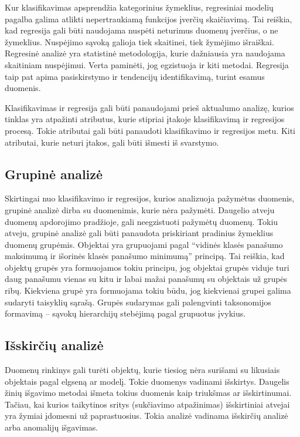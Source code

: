 Kur klasifikavimas apsprendžia kategorinius žymeklius, regresiniai modelių pagalba galima atlikti nepertraukiamą funkcijos įverčių skaičiavimą.
Tai reiškia, kad regresija gali būti naudojama nuspėti neturimus duomenų įverčius, o ne žymeklius.
Nuspėjimo sąvoką galioja tiek skaitinei, tiek žymėjimo išraiškai.
Regresinė analizė yra statistinė metodologija, kurie dažniausia yra naudojama skaitiniam nuspėjimui. 
Verta paminėti, jog egzistuoja ir kiti metodai. 
Regresija taip pat apima pasiskirstymo ir tendencijų identifikavimą, turint esamus duomenis.

Klasifikavimas ir regresija gali būti panaudojami prieš aktualumo analizę, kurios tinklas yra atpažinti atributus, kurie stipriai įtakoje klasifikavimą ir regresijos procesą.
Tokie atributai gali būti panaudoti klasifikavimo ir regresijos metu.
Kiti atributai, kurie neturi įtakos, gali būti išmesti iš svarstymo.

\subsection{Grupinė analizė}

Skirtingai nuo klasifikavimo ir regresijos, kurios analizuoja pažymėtus duomenis, grupinė analizė dirba su duomenimis, kurie nėra pažymėti.
Daugelio atveju duomenų apdorojimo pradžioje, gali neegzistuoti pažymėtų duomenų.
Tokiu atveju, grupinė analizė gali būti panaudota priskiriant pradinius žymeklius duomenų grupėmis.
Objektai yra grupuojami pagal ``vidinės klasės panašumo maksimumą ir išorinės klasės panašumo minimumą'' principą.
Tai reiškia, kad objektų grupės yra formuojamos tokiu principu, jog objektai grupės viduje turi daug panašumu vienas su kitu ir labai mažai panašumų su objektais už grupės ribų. 
Kiekviena grupė yra formuojama tokiu būdu, jog kiekvienai grupei galima sudaryti taisyklių sąrašą.
Grupės sudarymas gali palengvinti taksonomijos formavimą -- sąvokų hierarchijų stebėjimą pagal grupuotus įvykius.

\subsection{Išskirčių analizė}

Duomenų rinkinys gali turėti objektų, kurie tiesiog nėra surišami su likusiais objektais pagal elgseną ar modelį. 
Tokie duomenys vadinami išskirtys.
Daugelis žinių išgavimo metodai išmeta tokius duomenis kaip triukšmas ar išskirtinumai.
Tačiau, kai kurios taikytinos sritys (sukčiavimo atpažinimas) išskirtiniai atvejai yra žymiai įdomesni už paprastuosius.
Tokia analizė vadinama išskirčių analizė arba anomalijų išgavimas.

